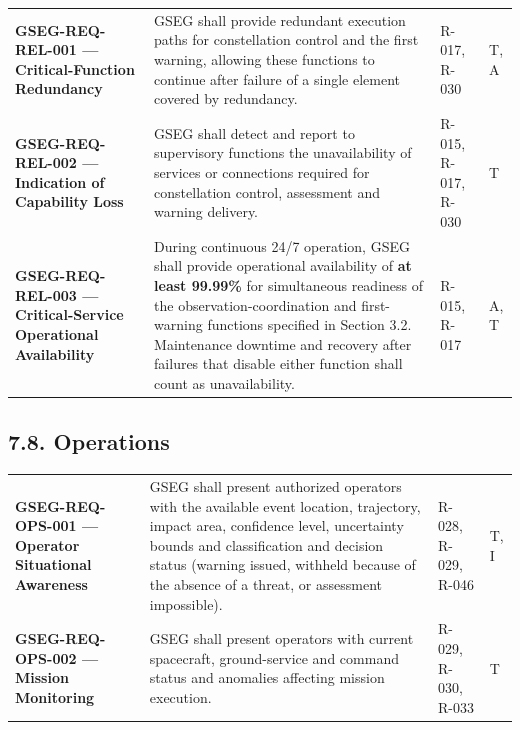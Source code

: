 \begingroup{}
\begin{longtable}{|P{0.27}|P{0.46}|P{0.16}|P{0.11}|}
\hline{}
 &  &  & \\ \hline
\endhead
\hline\endlastfoot
\textbf{GSEG-REQ-REL-001 — Critical-Function Redundancy} & GSEG shall provide redundant execution paths for constellation control and the first warning, allowing these functions to continue after failure of a single element covered by redundancy. & R-017, R-030 & T, A\\ \hline
\textbf{GSEG-REQ-REL-002 — Indication of Capability Loss} & GSEG shall detect and report to supervisory functions the unavailability of services or connections required for constellation control, assessment and warning delivery. & R-015, R-017, R-030 & T\\ \hline
\textbf{GSEG-REQ-REL-003 — Critical-Service Operational Availability} & During continuous 24/\allowbreak{}7 operation, GSEG shall provide operational availability of \textbf{at least 99.99\%} for simultaneous readiness of the observation-coordination and first-warning functions specified in Section 3.2. Maintenance downtime and recovery after failures that disable either function shall count as unavailability. & R-015, R-017 & A, T\\*
\end{longtable}
\endgroup

\subsection{7.8. Operations}\label{supervision-and-operations}

\begingroup{}
\begin{longtable}{|P{0.27}|P{0.46}|P{0.16}|P{0.11}|}
\hline{}
 &  &  & \\ \hline
\endhead
\hline\endlastfoot
\textbf{GSEG-REQ-OPS-001 — Operator Situational Awareness} & GSEG shall present authorized operators with the available event location, trajectory, impact area, confidence level, uncertainty bounds and classification and decision status (warning issued, withheld because of the absence of a threat, or assessment impossible). & R-028, R-029, R-046 & T, I\\ \hline
\textbf{GSEG-REQ-OPS-002 — Mission Monitoring} & GSEG shall present operators with current spacecraft, ground-service and command status and anomalies affecting mission execution. & R-029, R-030, R-033 & T\\*
\end{longtable}
\endgroup

